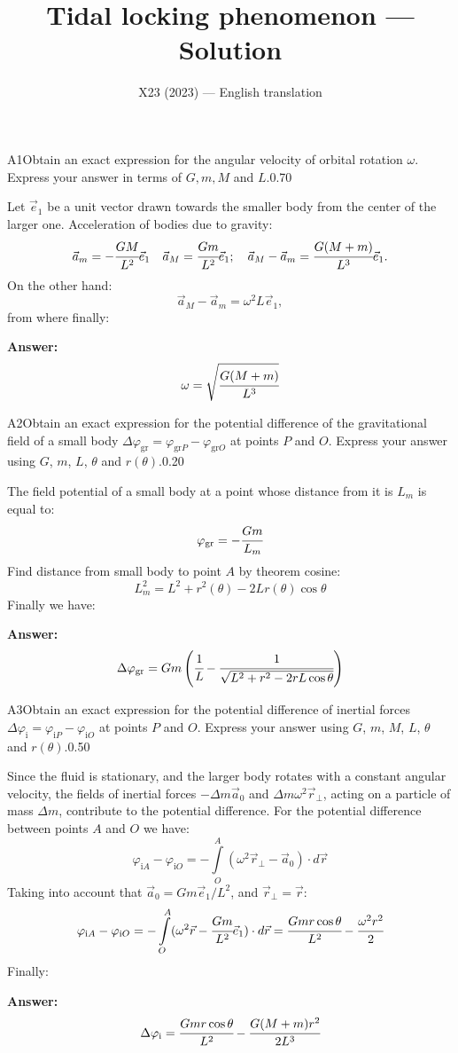 \documentclass[11pt,a4paper]{article}
\title{\textbf{Tidal locking phenomenon --- Solution}}
\author{\normalsize X23 (2023) — English translation}
\date{}
\begin{document}
\maketitle\vspace{-0.5em}
\begin{solcard}{A1}{Obtain an exact expression for the angular velocity of orbital rotation $\omega$. Express your answer in terms of $G, m, M$ and $L$.}{0.70}

Let $\vec{e}_1$ be a unit vector drawn towards the smaller body from the center of the larger one. Acceleration of bodies due to gravity: $$\vec{a}_m=-\cfrac{GM}{L^2}\vec{e}_1\quad \vec{a}_M=\cfrac{Gm}{L^2}\vec{e}_1; \quad {\vec{a}_M-\vec{a}_m=\cfrac{G(M+m)}{L^3}\vec{e}_1}. $$ On the other hand: $$\vec{a}_M-\vec{a}_m=\omega^2L\vec{e}_1, $$ from where finally:

\par\smallskip\noindent\textbf{Answer:} $$\omega=\sqrt{\cfrac{G(M+m)}{L^3}} $$
\end{solcard}

\begin{solcard}{A2}{Obtain an exact expression for the potential difference of the gravitational field of a small body $\Delta{\varphi}_\text{gr}=\varphi_{\text{gr}P}-\varphi_{\text{gr}O}$ at points $P$ and $O$. Express your answer using $G$, $m$, $L$, $\theta$ and $r(\theta)$.}{0.20}

The field potential of a small body at a point whose distance from it is $L_m$ is equal to: $$\varphi_\text{gr}=-\cfrac{Gm}{L_m} $$ Find distance from small body to point $A$ by theorem cosine: $$L^2_m=L^2+r^2(\theta)-2Lr(\theta)\cos\theta $$ Finally we have:

\par\smallskip\noindent\textbf{Answer:} $$\Delta \varphi_{\text{gr}}=Gm\left(\cfrac{1}{L}-\cfrac{1}{\sqrt{L^2+r^2-2rL\cos\theta}}\right) $$
\end{solcard}

\begin{solcard}{A3}{Obtain an exact expression for the potential difference of inertial forces $\Delta{\varphi}_\text{i}=\varphi_{\text{i}P}-\varphi_{\text{i}O}$ at points $P$ and $O$. Express your answer using $G$, $m$, $M$, $L$, $\theta$ and $r(\theta)$.}{0.50}

Since the fluid is stationary, and the larger body rotates with a constant angular velocity, the fields of inertial forces $-\Delta{m}\vec{a}_0$ and $\Delta{m}\omega^2\vec{r}_\perp$, acting on a particle of mass $\Delta{m}$, contribute to the potential difference. For the potential difference between points $A$ and $O$ we have: $$\varphi_{\text{i}A}-\varphi_{\text{i}O}=-\int\limits_{O}^{A}(\omega^2\vec{r}_\perp-\vec{a}_0)\cdot d\vec{r} $$ Taking into account that $\vec{a}_0=Gm\vec{e}_1/L^2$, and $\vec{r}_\perp=\vec{r}$: $$\varphi_{\text{i}A}-\varphi_{\text{i}O}=-\int\limits_{O}^{A}(\omega^2\vec{r}-\cfrac{Gm}{L^2}\vec{e}_1)\cdot d\vec{r}=\cfrac{Gmr\cos\theta}{L^2}-\cfrac{\omega^2r^2}{2} $$ Finally:

\par\smallskip\noindent\textbf{Answer:} $$\Delta\varphi_\text{i}=\cfrac{Gmr\cos\theta}{L^2}-\cfrac{G(M+m)r^2}{2L^3} $$
\end{solcard}
\end{document}
